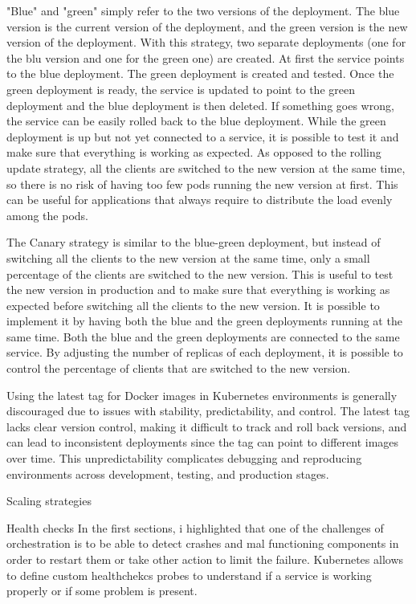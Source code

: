 \documentclass[sigplan,screen]{acmart}
\begin{document}
"Blue" and "green" simply refer to the two versions of the deployment. The blue version is the current version of the deployment, and the green version is the new version of the deployment. With this strategy, two separate deployments (one for the blu version and one for the green one) are created. At first the service points to the blue deployment. The green deployment is created and tested. Once the green deployment is ready, the service is updated to point to the green deployment and the blue deployment is then deleted. If something goes wrong, the service can be easily rolled back to the blue deployment. While the green deployment is up but not yet connected to a service, it is possible to test it and make sure that everything is working as expected. As opposed to the rolling update strategy, all the clients are switched to the new version at the same time, so there is no risk of having too few pods running the new version at first. This can be useful for applications that always require to distribute the load evenly among the pods.

The Canary strategy is similar to the blue-green deployment, but instead of switching all the clients to the new version at the same time, only a small percentage of the clients are switched to the new version. This is useful to test the new version in production and to make sure that everything is working as expected before switching all the clients to the new version. It is possible to implement it by having both the blue and the green deployments running at the same time. Both the blue and the green deployments are connected to the same service. By adjusting the number of replicas of each deployment, it is possible to control the percentage of clients that are switched to the new version.

Using the latest tag for Docker images in Kubernetes environments is generally discouraged due to issues with stability, predictability, and control. The latest tag lacks clear version control, making it difficult to track and roll back versions, and can lead to inconsistent deployments since the tag can point to different images over time. This unpredictability complicates debugging and reproducing environments across development, testing, and production stages.


Scaling strategies


Health checks
In the first sections, i highlighted that one of the challenges of orchestration is to be able to detect crashes and mal functioning components in order to restart them or take other action to limit the failure. Kubernetes allows to define custom healthchekcs probes to understand if a service is working properly or if some problem is present.
\end{document}
